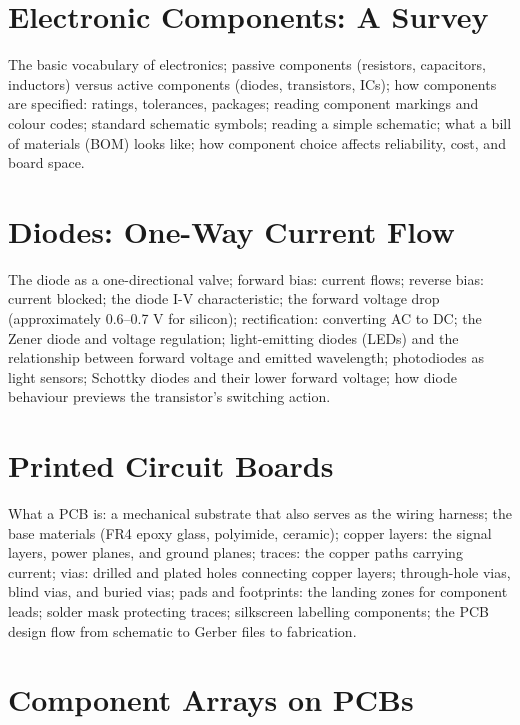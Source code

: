 \chapter{Electronic Components: A Survey}
\label{ch:components-survey}

The basic vocabulary of electronics; passive components (resistors,
capacitors, inductors) versus active components (diodes, transistors,
ICs); how components are specified: ratings, tolerances, packages; reading
component markings and colour codes; standard schematic symbols; reading
a simple schematic; what a bill of materials (BOM) looks like; how
component choice affects reliability, cost, and board space.

\chapter{Diodes: One-Way Current Flow}
\label{ch:diodes}

The diode as a one-directional valve; forward bias: current flows; reverse
bias: current blocked; the diode I-V characteristic; the forward voltage drop
(approximately 0.6--0.7 V for silicon); rectification: converting AC to DC;
the Zener diode and voltage regulation; light-emitting diodes (LEDs) and
the relationship between forward voltage and emitted wavelength; photodiodes
as light sensors; Schottky diodes and their lower forward voltage; how diode
behaviour previews the transistor's switching action.

\chapter{Printed Circuit Boards}
\label{ch:pcbs}

What a PCB is: a mechanical substrate that also serves as the wiring harness;
the base materials (FR4 epoxy glass, polyimide, ceramic); copper layers:
the signal layers, power planes, and ground planes; traces: the copper paths
carrying current; vias: drilled and plated holes connecting copper layers;
through-hole vias, blind vias, and buried vias; pads and footprints:
the landing zones for component leads; solder mask protecting traces;
silkscreen labelling components; the PCB design flow from schematic to
Gerber files to fabrication.

\chapter{Component Arrays on PCBs}
\label{ch:component-arrays}

